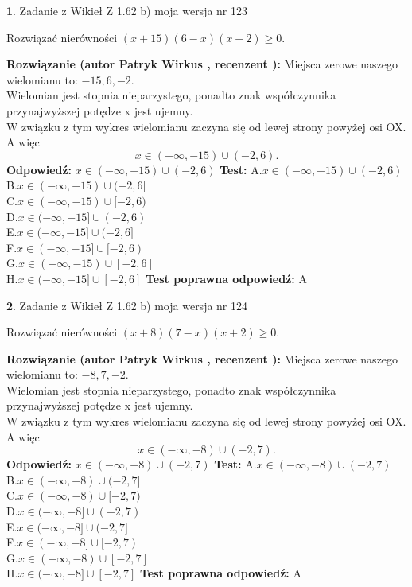 \documentclass[12pt, a4paper]{article}
\theoremstyle{definition} %
\newtheorem{zad}{}
\newcommand{\zadStart}[1]{\begin{zad}#1\newline}
\newcommand{\zadStop}{\end{zad}}
\newcommand{\rozwStart}[2]{\noindent \textbf{Rozwiązanie (autor #1 , recenzent #2): }\newline}
\newcommand{\rozwStop}{\newline}
\newcommand{\odpStart}{\noindent \textbf{Odpowiedź:}\newline}
\newcommand{\odpStop}{\newline}
\newcommand{\testStart}{\noindent \textbf{Test:}\newline}
\newcommand{\testStop}{\newline}
\newcommand{\kluczStart}{\noindent \textbf{Test poprawna odpowiedź:}\newline}
\newcommand{\kluczStop}{\newline}
\begin{document}
\zadStart{Zadanie z Wikieł Z 1.62 b) moja wersja nr 123}

Rozwiązać nierówności $(x+15)(6-x)(x+2)\ge0$.
\zadStop
\rozwStart{Patryk Wirkus}{}
Miejsca zerowe naszego wielomianu to: $-15, 6, -2$.\\
Wielomian jest stopnia nieparzystego, ponadto znak współczynnika przy\linebreak najwyższej potędze x jest ujemny.\\ W związku z tym wykres wielomianu zaczyna się od lewej strony powyżej osi OX. A więc $$x \in (-\infty,-15) \cup (-2,6).$$
\rozwStop
\odpStart
$x \in (-\infty,-15) \cup (-2,6)$
\odpStop
\testStart
A.$x \in (-\infty,-15) \cup (-2,6)$\\
B.$x \in (-\infty,-15) \cup (-2,6]$\\
C.$x \in (-\infty,-15) \cup [-2,6)$\\
D.$x \in (-\infty,-15] \cup (-2,6)$\\
E.$x \in (-\infty,-15] \cup (-2,6]$\\
F.$x \in (-\infty,-15] \cup [-2,6)$\\
G.$x \in (-\infty,-15) \cup [-2,6]$\\
H.$x \in (-\infty,-15] \cup [-2,6]$
\testStop
\kluczStart
A
\kluczStop



\zadStart{Zadanie z Wikieł Z 1.62 b) moja wersja nr 124}

Rozwiązać nierówności $(x+8)(7-x)(x+2)\ge0$.
\zadStop
\rozwStart{Patryk Wirkus}{}
Miejsca zerowe naszego wielomianu to: $-8, 7, -2$.\\
Wielomian jest stopnia nieparzystego, ponadto znak współczynnika przy\linebreak najwyższej potędze x jest ujemny.\\ W związku z tym wykres wielomianu zaczyna się od lewej strony powyżej osi OX. A więc $$x \in (-\infty,-8) \cup (-2,7).$$
\rozwStop
\odpStart
$x \in (-\infty,-8) \cup (-2,7)$
\odpStop
\testStart
A.$x \in (-\infty,-8) \cup (-2,7)$\\
B.$x \in (-\infty,-8) \cup (-2,7]$\\
C.$x \in (-\infty,-8) \cup [-2,7)$\\
D.$x \in (-\infty,-8] \cup (-2,7)$\\
E.$x \in (-\infty,-8] \cup (-2,7]$\\
F.$x \in (-\infty,-8] \cup [-2,7)$\\
G.$x \in (-\infty,-8) \cup [-2,7]$\\
H.$x \in (-\infty,-8] \cup [-2,7]$
\testStop
\kluczStart
A
\kluczStop
\end{document}
